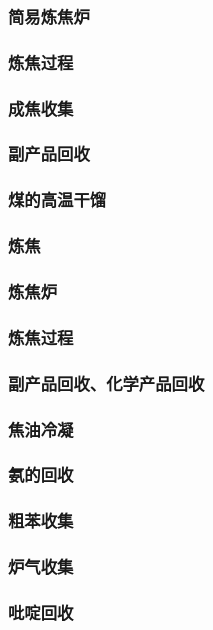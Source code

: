 \documentclass[UTF8]{../../ApplicationUniverse}
\begin{document}
    \subsubsection{简易炼焦炉}
    \subsubsection{炼焦过程}
    \subsubsection{成焦收集}
    \subsubsection{副产品回收}
\subsubsection{煤的高温干馏}
    \subsubsection{炼焦}
        \subsubsection{炼焦炉}
        \subsubsection{炼焦过程}
    \subsubsection{副产品回收、化学产品回收}
        \subsubsection{焦油冷凝}
        \subsubsection{氨的回收}
        \subsubsection{粗苯收集}
        \subsubsection{炉气收集}
        \subsubsection{吡啶回收}
\end{document}

